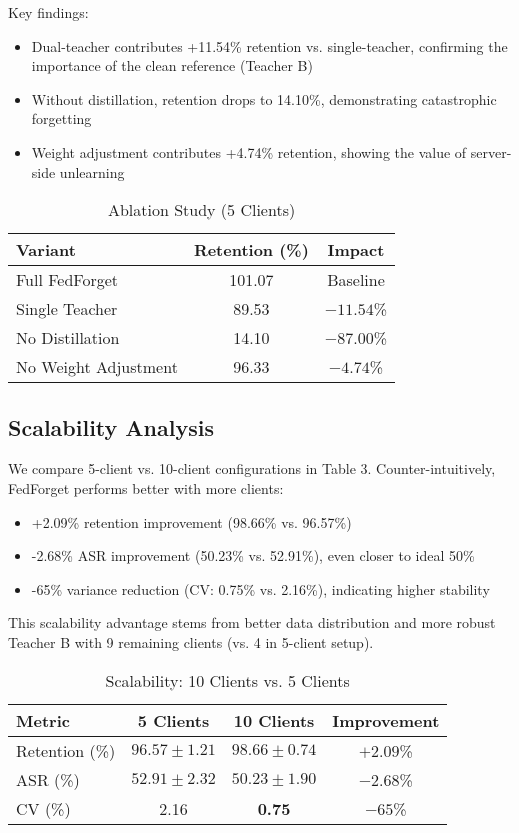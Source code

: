 \documentclass[10pt,twocolumn]{article}
\begin{document}
Key findings:
\begin{itemize}
\item Dual-teacher contributes +11.54\% retention vs. single-teacher, confirming the importance of the clean reference (Teacher B)
\item Without distillation, retention drops to 14.10\%, demonstrating catastrophic forgetting
\item Weight adjustment contributes +4.74\% retention, showing the value of server-side unlearning
\end{itemize}

\begin{table*}[t]
\centering
\caption{Ablation Study (5 Clients)}
\label{tab:ablation}
\begin{tabular}{lcc}
\toprule
Variant & Retention (\%) & Impact \\
\midrule
Full FedForget & 101.07 & Baseline \\
Single Teacher & 89.53 & $-11.54$\% \\
No Distillation & 14.10 & $-87.00$\% \\
No Weight Adjustment & 96.33 & $-4.74$\% \\
\bottomrule
\end{tabular}
\end{table*}

\subsection{Scalability Analysis}

We compare 5-client vs. 10-client configurations in Table 3. Counter-intuitively, FedForget performs better with more clients:

\begin{itemize}
\item +2.09\% retention improvement (98.66\% vs. 96.57\%)
\item -2.68\% ASR improvement (50.23\% vs. 52.91\%), even closer to ideal 50\%
\item -65\% variance reduction (CV: 0.75\% vs. 2.16\%), indicating higher stability
\end{itemize}

This scalability advantage stems from better data distribution and more robust Teacher B with 9 remaining clients (vs. 4 in 5-client setup).

\begin{table*}[t]
\centering
\caption{Scalability: 10 Clients vs. 5 Clients}
\label{tab:scalability}
\begin{tabular}{lccc}
\toprule
Metric & 5 Clients & 10 Clients & Improvement \\
\midrule
Retention (\%) & $96.57 \pm 1.21$ & $\mathbf{98.66} \pm \mathbf{0.74}$ & $+2.09$\% \\
ASR (\%) & $52.91 \pm 2.32$ & $\mathbf{50.23} \pm \mathbf{1.90}$ & $-2.68$\% \\
CV (\%) & 2.16 & \textbf{0.75} & $-65$\% \\
\bottomrule
\end{tabular}
\end{table*}
\end{document}
